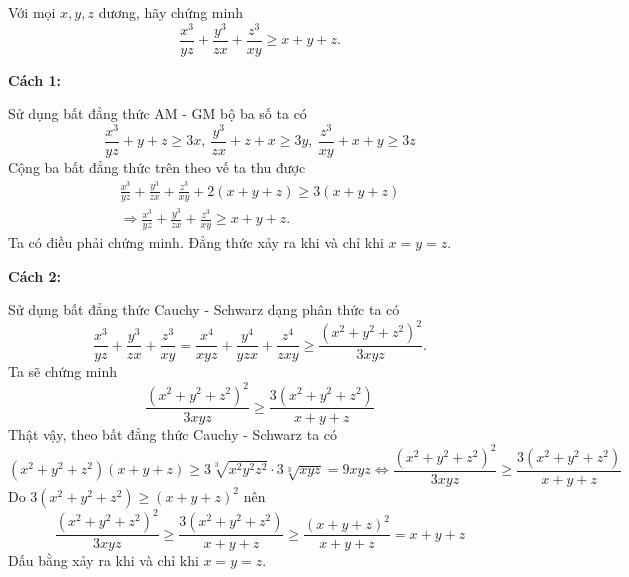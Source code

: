 \begin{problem}
	Với mọi $x, y, z$ dương, hãy chứng minh
	\[
		\frac{x^3}{yz} + \frac{y^3}{zx} + \frac{z^3}{xy} \ge x + y + z.
	\]
	\solution

	\textbf{Cách 1:}

	Sử dụng bất đẳng thức AM - GM bộ ba số ta có
	\[
		\frac{x^3}{yz} + y + z \ge 3x,\ \frac{y^3}{zx} + z + x \ge 3y,\ \frac{z^3}{xy} + x + y \ge 3z
	\]
	Cộng ba bất đẳng thức trên theo vế ta thu được
	\begin{align*}
		\frac{x^3}{yz} + \frac{y^3}{zx} + \frac{z^3}{xy} + 2(x + y + z) \ge 3(x + y + z) \\
		\Rightarrow \frac{x^3}{yz} + \frac{y^3}{zx} + \frac{z^3}{xy} \ge x + y + z.
	\end{align*}
	Ta có điều phải chứng minh. Đẳng thức xảy ra khi và chỉ khi $x = y = z$.

	\textbf{Cách 2:}
	
	Sử dụng bất đẳng thức Cauchy - Schwarz dạng phân thức ta có
	\[
		\frac{x^3}{yz} + \frac{y^3}{zx} + \frac{z^3}{xy} = \frac{x^4}{xyz} + \frac{y^4}{yzx} + \frac{z^4}{zxy} \ge \frac{(x^2 + y^2 + z^2)^2}{3xyz}.
	\]
	Ta sẽ chứng minh 
	\[
		\frac{(x^2 + y^2 + z^2)^2}{3xyz} \ge \frac{3(x^2 + y^2 + z^2)}{x + y + z}
	\]
	Thật vậy, theo bất đẳng thức Cauchy - Schwarz ta có
	\[
		(x^2 +y^2 + z^2)(x + y + z) \ge 3\sqrt[3]{x^2 y^2 z^2} \cdot 3\sqrt[3]{xyz} = 9xyz
		\Leftrightarrow \frac{(x^2 + y^2 + z^2)^2}{3xyz} \ge \frac{3(x^2 + y^2 + z^2)}{x + y + z}
	\]
	Do $3(x^2 + y^2 + z^2) \ge (x + y + z)^2$ nên
	\[
		\frac{(x^2 + y^2 + z^2)^2}{3xyz} \ge \frac{3(x^2 + y^2 + z^2)}{x + y + z} \ge \frac{(x + y + z)^2}{x + y + z} = x + y + z
	\]
	Dấu bằng xảy ra khi và chỉ khi $x = y = z$.
\end{problem}